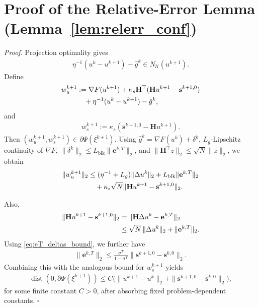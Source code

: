 \documentclass[letterpaper, 10 pt, conference]{ieeeconf} %
\newenvironment{proof}[1][Proof]{\par\noindent\textit{#1. }\ignorespaces}
  {\hfill$\square$\par}
\DeclareMathOperator{\dist}{dist}
\begin{document}
\section{Proof of the Relative-Error Lemma
(Lemma~\ref{lem:relerr_conf})}
\label{app:relerr_proof}
\begin{proof}
Projection optimality gives
\begin{align}
\eta^{-1}(u^k-u^{k+1})-\hat g^k \in N_{\mathcal U}(u^{k+1}).
\end{align}
Define
\begin{align}
w_u^{k+1}
&:= \nabla F(u^{k+1})
+\kappa_s\mathbf H^\top(\mathbf H u^{k+1}-\mathbf s^{k+1,0}) \notag\\
&\quad +\eta^{-1}(u^k-u^{k+1})-\hat g^k,
\end{align}
and
\begin{align}
w_s^{k+1}:=\kappa_s(\mathbf s^{k+1,0}-\mathbf H u^{k+1}).
\end{align}
Then \((w_u^{k+1},w_s^{k+1})\in\partial\Psi(\xi^{k+1})\). Using
\(\hat g^k=\nabla F(u^k)+\delta^k\), \(L_g\)-Lipschitz continuity of \(\nabla F\),
\(\|\delta^k\|_2\le L_{\mathrm{blk}}\|\mathbf e^{k,T}\|_2\), and
\(\|\mathbf H^\top z\|_2\le \sqrt N\|z\|_2\), we obtain
\begin{align}
\|w_u^{k+1}\|_2
&\le (\eta^{-1}+L_g)\|\Delta u^k\|_2
+L_{\mathrm{blk}}\|\mathbf e^{k,T}\|_2 \notag\\
&\quad +\kappa_s\sqrt N
\|\mathbf H u^{k+1}-\mathbf s^{k+1,0}\|_2 .
\end{align}

Also,
\begin{align}
\|\mathbf H u^{k+1}-\mathbf s^{k+1,0}\|_2
&= \|\mathbf H\Delta u^k-\mathbf e^{k,T}\|_2 \notag\\
&\le \sqrt N\,\|\Delta u^k\|_2+\|\mathbf e^{k,T}\|_2.
\end{align}
Using \eqref{eq:eT_deltas_bound}, we further have
\begin{align}
\|\mathbf e^{k,T}\|_2
\le
\frac{\sigma^T}{1-\sigma^T}
\|\mathbf{s}^{k+1,0}-\mathbf{s}^{k,0}\|_2 .
\end{align}
Combining this with the analogous bound for \(w_s^{k+1}\) yields
\begin{align}
\dist(0,\partial\Psi(\xi^{k+1}))
\le
C\Big(
\|u^{k+1}-u^k\|_2
+
\|\mathbf{s}^{k+1,0}-\mathbf{s}^{k,0}\|_2
\Big),
\end{align}
for some finite constant \(C>0\), after absorbing fixed problem-dependent constants.
\end{proof}
\end{document}
